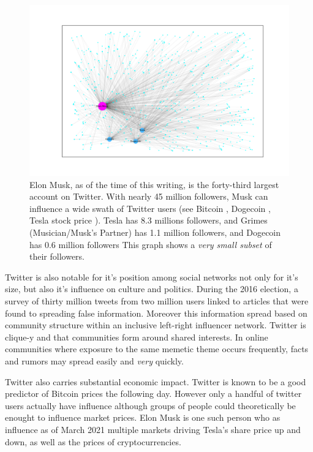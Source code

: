 \begin{figure}
    \includegraphics[width=15cm]{Images/elon_graph.png}
    \centering
    \caption{Elon Musk, as of the time of this writing, is the forty-third largest account on Twitter. With nearly 45 million
    followers, Musk can influence a wide swath of Twitter users (see Bitcoin \cite{elontweet2}, Dogecoin \cite{dogecoin}, Tesla stock price \cite{elontweet}).
    Tesla has 8.3 millions followers,
     and Grimes (Musician/Musk's Partner) has 1.1 million followers, 
     and Dogecoin has 0.6 million followers
      This graph shows a \textit{very small subset} of their followers.}
\end{figure}


Twitter is also notable for it's position among social networks not only for it's size,
but also it's influence on culture and politics. During the 2016 election, a survey of
thirty million tweets from two million users linked to articles that were found to spreading
false information. Moreover this information spread based on community structure within an inclusive left-right
influencer network. Twitter is clique-y and that communities form around 
shared interests. In online communities where exposure to the same memetic theme occurs frequently, 
facts and rumors may spread easily and \textit{very} quickly. \cite{bessi}

Twitter also carries substantial economic impact. Twitter is known to be a good predictor of Bitcoin prices
the following day. \cite{bitcoin} However only a handful of twitter users actually have influence 
although groups of people could theoretically be enought to influence market prices. \cite{stonks}
Elon Musk is one such person who as influence as of March 2021 multiple markets driving Tesla's share
price up and down, as well as the prices of cryptocurrencies. \cite{elontweet} \cite{elontweet2} \cite{dogecoin}

